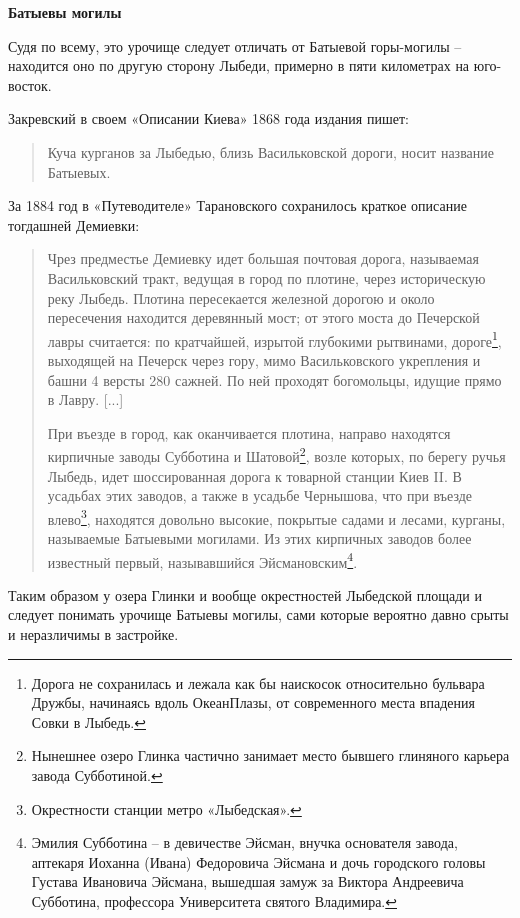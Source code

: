 \newpage


\textbf{Батыевы могилы}

Судя по всему, это урочище следует отличать от Батыевой горы-могилы – находится оно по другую сторону Лыбеди, примерно в пяти километрах на юго-восток.

Закревский в своем «Описании Киева» 1868 года издания пишет:

\begin{quotation}
\noindent Куча курганов за Лыбедью, близь Васильковской дороги, носит название Батыевых.
\end{quotation}

За 1884 год в «Путеводителе» Тарановского сохранилось краткое описание тогдашней Демиевки:

\begin{quotation}
Чрез предместье Демиевку идет большая почтовая дорога, называемая Васильковский тракт, ведущая в город по плотине, через историческую реку Лыбедь. Плотина пересекается железной дорогою и около пересечения находится деревянный мост; от этого моста до Печерской лавры считается: по кратчайшей, изрытой глубокими рытвинами, дороге\footnote{Дорога не сохранилась и лежала как бы наискосок относительно бульвара Дружбы, начинаясь вдоль ОкеанПлазы, от современного места впадения Совки в Лыбедь.}, выходящей на Печерск через гору, мимо Васильковского укрепления и башни 4 версты 280 сажней. По ней проходят богомольцы, идущие прямо в Лавру. [...]

При въезде в город, как оканчивается плотина, направо находятся кирпичные заводы Субботина и Шатовой\footnote{Нынешнее озеро Глинка частично занимает место бывшего глиняного карьера завода Субботиной.}, возле которых, по берегу ручья Лыбедь, идет шоссированная дорога к товарной станции Киев II. В усадьбах этих заводов, а также в усадьбе Чернышова, что при въезде влево\footnote{Окрестности станции метро «Лыбедская».}, находятся довольно высокие, покрытые садами и лесами, курганы, называемые Батыевыми могилами. Из этих кирпичных заводов более известный первый, называвшийся Эйсмановским\footnote{Эмилия Субботина – в девичестве Эйсман, внучка основателя завода, аптекаря Иоханна (Ивана) Федоровича Эйсмана и дочь городского головы Густава Ивановича Эйсмана, вышедшая замуж за Виктора Андреевича Субботина, профессора Университета святого Владимира.}. 
\end{quotation}

Таким образом у озера Глинки и вообще окрестностей Лыбедской площади и следует понимать урочище Батыевы могилы, сами которые вероятно давно срыты и неразличимы в застройке.\\

